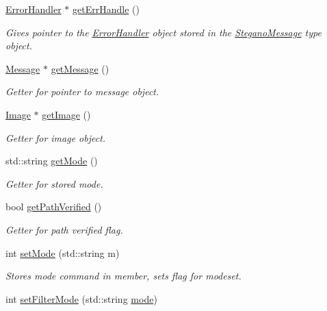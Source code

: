 \begin{DoxyCompactItemize}
\mbox{\hyperlink{classErrorHandler}{Error\+Handler}} $\ast$ \mbox{\hyperlink{classSteganoMessage_a0134757a8c79caa9dca9bcce0686d1ef}{get\+Err\+Handle}} ()
\begin{DoxyCompactList}\small\item\em Gives pointer to the \mbox{\hyperlink{classErrorHandler}{Error\+Handler}} object stored in the \mbox{\hyperlink{classSteganoMessage}{Stegano\+Message}} type object. \end{DoxyCompactList}\item 
\mbox{\hyperlink{classMessage}{Message}} $\ast$ \mbox{\hyperlink{classSteganoMessage_ad29978e925056ad70dc5c45b1e1681eb}{get\+Message}} ()
\begin{DoxyCompactList}\small\item\em Getter for pointer to message object. \end{DoxyCompactList}\item 
\mbox{\hyperlink{classImage}{Image}} $\ast$ \mbox{\hyperlink{classSteganoMessage_a2e3ad705a0219edfd2150f3f7931979c}{get\+Image}} ()
\begin{DoxyCompactList}\small\item\em Getter for image object. \end{DoxyCompactList}\item 
std\+::string \mbox{\hyperlink{classSteganoMessage_a7dc660e6d2c8f162636f789cfedde67e}{get\+Mode}} ()
\begin{DoxyCompactList}\small\item\em Getter for stored mode. \end{DoxyCompactList}\item 
bool \mbox{\hyperlink{classSteganoMessage_ace172144e49a4da69b890958b3b8089b}{get\+Path\+Verified}} ()
\begin{DoxyCompactList}\small\item\em Getter for path verified flag. \end{DoxyCompactList}\item 
int \mbox{\hyperlink{classSteganoMessage_a3e06a73baa5744b5eb9152f4ae65f458}{set\+Mode}} (std\+::string m)
\begin{DoxyCompactList}\small\item\em Stores mode command in member, sets flag for modeset. \end{DoxyCompactList}\item 
int \mbox{\hyperlink{classSteganoMessage_a5c3ef910b17f4bbe32a73a33be9d7586}{set\+Filter\+Mode}} (std\+::string \mbox{\hyperlink{classSteganoMessage_a8772194b7823da730648f8d4c06334a8}{mode}})

\end{DoxyCompactItemize}
